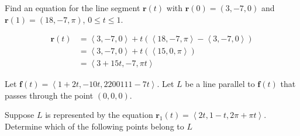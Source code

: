 \documentclass[12pt]{exam}
\newcommand{\br}{\bm{r}}
\newcommand{\gen}[1]{\left\langle #1 \right\rangle}
\theoremstyle{definition}
\theoremstyle{remark}
\begin{document}
\begin{questions}

\question Find an equation for the line segment \(\br(t)\) with \(\br(0)=(3,-7,0)\) and \(\br(1)=(18,-7,\pi)\), \(0\le t \le 1\).

\ifprintanswers
        \begin{solution}
            \begin{align*}
                \br(t) & = \gen{3,-7,0}+t(\gen{18,-7,\pi}-\gen{3,-7,0})\\
                    & = \gen{3,-7,0}+t(\gen{15,0,\pi})\\
                    & = \gen{3+15t,-7,\pi t}
            \end{align*}
        \end{solution}
    \else
        \vfill
    \fi    

\question Let \(\bm{f}(t)=\gen{1+2t,-10t,2200111-7t}\). Let \(L\) be a line parallel to \(\bm{f}(t)\) that passes through the point \((0,0,0)\). 

\newpage 

\question Suppose \(L\) is represented by the equation \(\br_1(t)=\gen{2t,1-t,2\pi+\pi t}\). Determine which of the following points belong to \(L\)
\end{questions}
\end{document}
